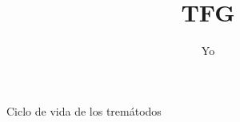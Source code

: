 \documentclass{article}
\author{Yo}
\title{TFG}
\begin{document}
\maketitle
Ciclo de vida de los tremátodos
\end{document}
